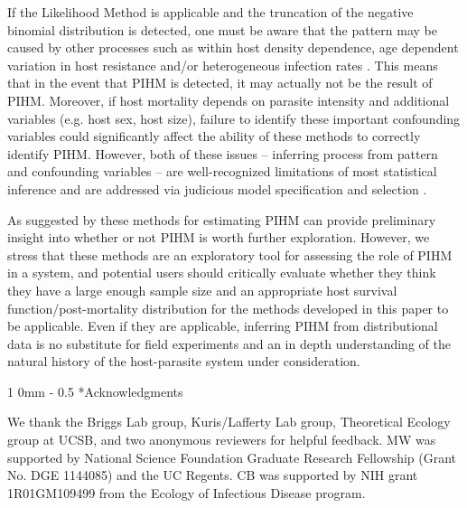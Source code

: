 \documentclass[12pt, a4paper]{article}
\makeatletter
\renewcommand{\section}{\@startsection
{section}%
{1}%
{0mm}%
{-\baselineskip}%
{0.5\baselineskip}%
{\normalfont\bf\large}} %
\makeatother
\begin{document}
If the Likelihood Method is applicable and the truncation of the negative binomial distribution is detected, one must be aware that the pattern may be caused by other
processes such as within host density dependence, age dependent variation in host
resistance and/or heterogeneous infection rates \citep{Anderson1982a,Rousset1996, McCallum2000a}. This means that in the event
that PIHM is detected, it may actually not be the result of PIHM.  Moreover, if host mortality depends on parasite intensity and additional variables (e.g. host sex, host size), failure to identify these important confounding variables could significantly affect the ability of these methods to correctly identify PIHM. However, both of these issues -- inferring process from pattern and confounding variables -- are well-recognized limitations of most statistical inference and are addressed via judicious model specification and selection \citep{Seber2003}.

As suggested by \cite{Lester1984} these methods for estimating PIHM can
provide preliminary insight into whether or not PIHM is worth further
exploration.  However, we stress that these methods are an
exploratory tool for assessing the role of PIHM in a system, and potential
users should critically evaluate whether they think they have a large enough
sample size and an appropriate host survival function/post-mortality distribution for the methods developed
in this paper to be applicable.  Even if they are applicable, inferring PIHM
from distributional data is no substitute for field experiments
and an in depth understanding of the natural history of the host-parasite
system under consideration.

\section*{Acknowledgments}

We thank the Briggs Lab group, Kuris/Lafferty Lab group, Theoretical Ecology group at UCSB, and two anonymous reviewers for helpful feedback.  MW was supported by National Science Foundation Graduate Research Fellowship (Grant No. DGE 1144085) and the UC Regents. CB was supported by NIH grant 1R01GM109499 from the Ecology of Infectious Disease program.



\singlespacing


\end{document}
